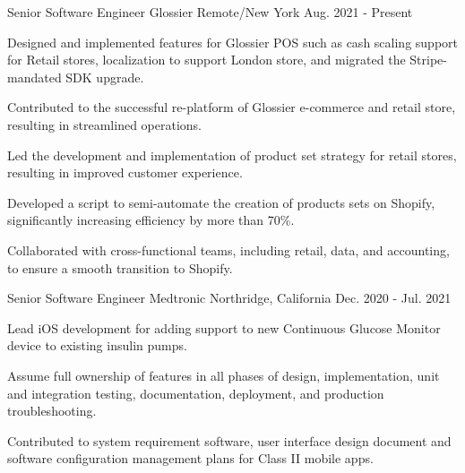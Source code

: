 

\begin{cventries}

  \cventry
    {Senior Software Engineer} %
    {Glossier} %
    {Remote/New York} %
    {Aug. 2021 - Present} %
    {
      \begin{cvitems} %
        \item {Designed and implemented features for Glossier POS such as cash scaling support for Retail stores, localization to support London store, and migrated the Stripe-mandated SDK upgrade.}
        \item {Contributed to the successful re-platform of Glossier e-commerce and retail store, resulting in streamlined operations. }
        \item {Led the development and implementation of product set strategy for retail stores, resulting in improved customer experience.}
        \item {Developed a script to semi-automate the creation of products sets on Shopify, significantly increasing efficiency by more than 70\%.}
        \item {Collaborated with cross-functional teams, including retail, data, and accounting, to ensure a smooth transition to Shopify.}
      \end{cvitems}
    }


  \cventry
    {Senior Software Engineer} %
    {Medtronic} %
    {Northridge, California} %
    {Dec. 2020 - Jul. 2021} %
    {
      \begin{cvitems} %
        \item {Lead iOS development for adding support to new Continuous Glucose Monitor device to existing insulin pumps.}
        \item {Assume full ownership of features in all phases of design, implementation, unit and integration testing, documentation, deployment, and production troubleshooting.}
        \item {Contributed to system requirement software, user interface design document and software configuration management plans for Class II mobile apps.}
      \end{cvitems}
    }


\end{cventries}
